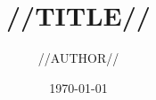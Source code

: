 \documentclass[12pt]{article}
\begin{document}
\pagestyle{empty}

\title{//TITLE//}
\author{//AUTHOR//}
\date{\today}

\maketitle

\newpage

\begin{enumerate}
\begin{lightninground}


\end{lightninground}
\end{enumerate}
\end{document}

